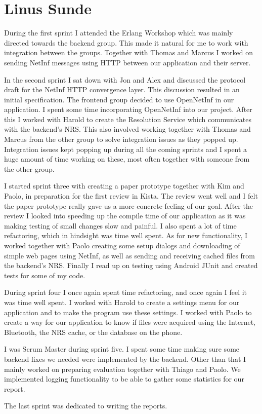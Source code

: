 \section{Linus Sunde}

During the first sprint I attended the Erlang Workshop which was mainly directed towards the backend group. This made it natural for me to work with integration between the groups. Together with Thomas and Marcus I worked on sending NetInf messages using HTTP between our application and their server.

In the second sprint I sat down with Jon and Alex and discussed the protocol draft for the NetInf HTTP convergence layer. This discussion resulted in an initial specification. The frontend group decided to use OpenNetInf in our application. I spent some time incorporating OpenNetInf into our project. After this I worked with Harold to create the Resolution Service which communicates with the backend's NRS. This also involved working together with Thomas and Marcus from the other group to solve integration issues as they popped up. Integration issues kept popping up during all the coming sprints and I spent a huge amount of time working on these, most often together with someone from the other group.

I started sprint three with creating a paper prototype together with Kim and Paolo, in preparation for the first review in Kista. The review went well and I felt the paper prototype really gave us a more concrete feeling of our goal. After the review I looked into speeding up the compile time of our application as it was making testing of small changes slow and painful. I also spent a lot of time refactoring, which in hindsight was time well spent. As for new functionality, I worked together with Paolo creating some setup dialogs and downloading of simple web pages using NetInf, as well as sending and receiving cached files from the backend's NRS. Finally I read up on testing using Android JUnit and created tests for some of my code.

During sprint four I once again spent time refactoring, and once again I feel it was time well spent. I worked with Harold to create a settings menu for our application and to make the program use these settings. I worked with Paolo to create a way for our application to know if files were acquired using the Internet, Bluetooth, the NRS cache, or the database on the phone.

I was Scrum Master during sprint five. I spent some time making sure some backend fixes we needed were implemented by the backend. Other than that I mainly worked on preparing evaluation together with Thiago and Paolo. We implemented logging functionality to be able to gather some statistics for our report.

The last sprint was dedicated to writing the reports.
